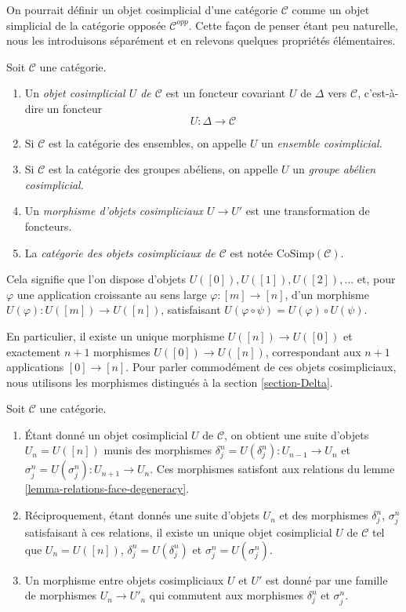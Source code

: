 \noindent
On pourrait définir un objet cosimplicial d'une catégorie $\mathcal{C}$
comme un objet simplicial de la catégorie opposée $\mathcal{C}^{opp}$.
Cette façon de penser étant peu naturelle, nous les introduisons séparément
et en relevons quelques propriétés élémentaires.

\begin{definition}
\label{definition-cosimplicial-object}
Soit $\mathcal{C}$ une catégorie.
\begin{enumerate}
\item Un {\it objet cosimplicial $U$ de $\mathcal{C}$}
est un foncteur covariant $U$ de $\Delta$ vers
$\mathcal{C}$, c'est-à-dire un foncteur
$$
U : \Delta \longrightarrow \mathcal{C}
$$
\item Si $\mathcal{C}$ est la catégorie des ensembles, on appelle
$U$ un {\it ensemble cosimplicial}.
\item Si $\mathcal{C}$ est la catégorie des groupes abéliens,
on appelle $U$ un {\it groupe abélien cosimplicial}.
\item Un {\it morphisme d'objets cosimpliciaux $U \to U'$}
est une transformation de foncteurs.
\item La {\it catégorie des objets cosimpliciaux de $\mathcal{C}$}
est notée $\text{CoSimp}(\mathcal{C})$.
\end{enumerate}
\end{definition}

\noindent
Cela signifie que l'on dispose d'objets $U([0]), U([1]), U([2]), \ldots$
et, pour $\varphi$ une application croissante au sens large
$\varphi : [m] \to [n]$, d'un morphisme
$U(\varphi) : U([m]) \to U([n])$, satisfaisant
$U(\varphi \circ \psi) = U(\varphi) \circ U(\psi)$.

\medskip\noindent
En particulier, il existe un unique morphisme $U([n]) \to U([0])$ et
exactement $n + 1$ morphismes $U([0]) \to U([n])$, correspondant aux
$n + 1$ applications $[0] \to [n]$. Pour parler commodément de ces
objets cosimpliciaux, nous utilisons les morphismes distingués à la
section \ref{section-Delta}.

\begin{lemma}
\label{lemma-characterize-cosimplicial-object}
Soit $\mathcal{C}$ une catégorie.
\begin{enumerate}
\item Étant donné un objet cosimplicial $U$ de $\mathcal{C}$, on obtient
une suite d'objets $U_n = U([n])$ munis des morphismes
$\delta^n_j = U(\delta^n_j) : U_{n - 1} \to U_n$ et
$\sigma^n_j = U(\sigma^n_j) : U_{n + 1} \to U_n$. Ces morphismes
satisfont aux relations du lemme \ref{lemma-relations-face-degeneracy}.
\item Réciproquement, étant donnés une suite d'objets $U_n$ et des
morphismes $\delta^n_j$, $\sigma^n_j$ satisfaisant à ces relations, il
existe un unique objet cosimplicial $U$ de $\mathcal{C}$ tel que
$U_n = U([n])$, $\delta^n_j = U(\delta^n_j)$ et
$\sigma^n_j = U(\sigma^n_j)$.
\item Un morphisme entre objets cosimpliciaux $U$ et $U'$ est donné par
une famille de morphismes $U_n \to U'_n$ qui commutent aux morphismes
$\delta^n_j$ et $\sigma^n_j$.
\end{enumerate}
\end{lemma}


